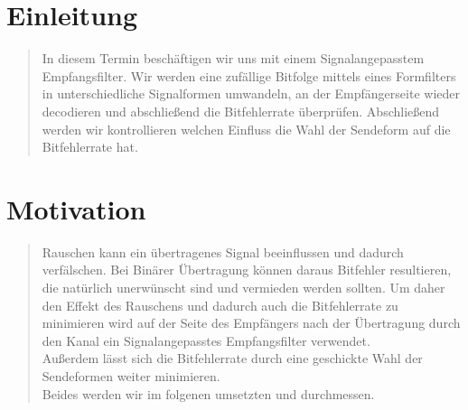\section{Einleitung}
\begin{quote}

	In diesem Termin beschäftigen wir uns mit einem Signalangepasstem Empfangsfilter. Wir werden eine zufällige Bitfolge
	mittels eines Formfilters in unterschiedliche Signalformen umwandeln, an der
	Empfängerseite wieder decodieren und abschließend die Bitfehlerrate überprüfen. 
	Abschließend werden wir kontrollieren welchen Einfluss die Wahl der
	Sendeform auf die Bitfehlerrate hat.


\end{quote}%

\section{Motivation}
\begin{quote}

	Rauschen kann ein übertragenes Signal beeinflussen und dadurch verfälschen. Bei Binärer Übertragung können daraus
	Bitfehler resultieren, die natürlich unerwünscht sind und vermieden werden sollten. Um daher den Effekt des Rauschens
	und dadurch auch die Bitfehlerrate zu minimieren wird auf der Seite des Empfängers nach der Übertragung
	durch den Kanal ein Signalangepasstes Empfangsfilter verwendet.\\
	Außerdem lässt sich die Bitfehlerrate durch eine geschickte Wahl der Sendeformen weiter minimieren.\\
	Beides werden wir im folgenen umsetzten und durchmessen. 

\end{quote} %



